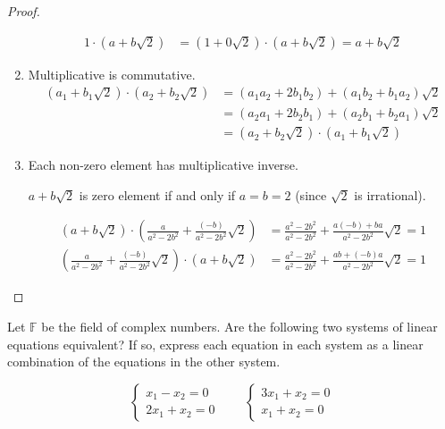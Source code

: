 \begin{proof}
\begin{enumerate}[label = (\arabic*)]
\begin{align*}
                  1\cdot (a + b\sqrt{2}) & = (1 + 0\sqrt{2})\cdot (a + b\sqrt{2}) = a + b\sqrt{2}
              \end{align*}
        \item Multiplicative is commutative.
              \begin{align*}
                  (a_{1} + b_{1}\sqrt{2})\cdot (a_{2} + b_{2}\sqrt{2}) & = (a_{1}a_{2} + 2b_{1}b_{2}) + (a_{1}b_{2} + b_{1}a_{2})\sqrt{2} \\
                                                                       & = (a_{2}a_{1} + 2b_{2}b_{1}) + (a_{2}b_{1} + b_{2}a_{1})\sqrt{2} \\
                                                                       & = (a_{2} + b_{2}\sqrt{2})\cdot (a_{1} + b_{1}\sqrt{2})
              \end{align*}
        \item Each non-zero element has multiplicative inverse.

              $a + b\sqrt{2}$ is zero element if and only if $a = b = 2$ (since $\sqrt{2}$ is irrational).

              \begin{align*}
                  (a + b\sqrt{2})\cdot \left( \frac{a}{a^{2} - 2b^{2}} + \frac{(-b)}{a^{2} - 2b^{2}}\sqrt{2} \right) & = \frac{a^{2} - 2b^{2}}{a^{2} - 2b^{2}} + \frac{a(-b) + ba}{a^{2} - 2b^{2}}\sqrt{2} = 1 \\
                  \left( \frac{a}{a^{2} - 2b^{2}} + \frac{(-b)}{a^{2} - 2b^{2}}\sqrt{2} \right)\cdot (a + b\sqrt{2}) & = \frac{a^{2} - 2b^{2}}{a^{2} - 2b^{2}} + \frac{ab + (-b)a}{a^{2} - 2b^{2}}\sqrt{2} = 1
              \end{align*}
    \end{enumerate}
\end{proof}

Let $\mathbb{F}$ be the field of complex numbers. Are the following two systems of linear equations equivalent? If so, express each equation in each system as a linear combination of the equations in the other system.

\begin{exercise}
    \[
        \begin{cases}
            x_{1} - x_{2} = 0 \\
            2x_{1} + x_{2} = 0
        \end{cases}
        \qquad
        \begin{cases}
            3x_{1} + x_{2} = 0 \\
            x_{1} + x_{2} = 0
        \end{cases}
    \]
\end{exercise}

